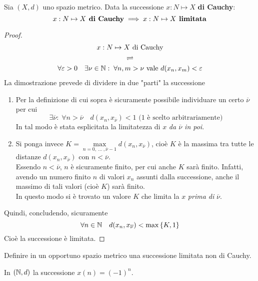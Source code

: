 \begin{proposition}
	\label{prop:se_cau_allora_lim}
	Sia $(X,d)$ uno spazio metrico. Data la successione $x: N \mapsto X$ \textbf{di Cauchy}:
	$$x: N \mapsto X \text{\textbf{ di Cauchy}} \implies x: N \mapsto X \text{\textbf{ limitata}}$$
	\begin{proof}
		\begin{equation*}
			\begin{gathered}
				x: N \mapsto X \text{ di Cauchy}\\
				\rightleftharpoons\\
				\forall \varepsilon > 0\quad \exists \nu \in \mathbb{N}:\; \forall n,m > \nu \text{ vale } d(x_n, x_m) < \varepsilon
			\end{gathered}
		\end{equation*}
		La dimostrazione prevede di dividere in due "parti" la successione
		\begin{enumerate}
			\item Per la definizione di cui sopra è sicuramente possibile individuare un certo $\overline{\nu}$ per cui
				$$\exists \overline{\nu}:\; \forall n > \overline{\nu} \quad d(x_n, x_{\overline{\nu}}) < 1 \text{ (1 è scelto arbitrariamente)}$$
				In tal modo è stata esplicitata la limitatezza di $x$ \textit{da $\overline{\nu}$ in poi}.
			\item Si ponga invece $K = \max\limits_{n=0,\: \dotsc \:, \overline{\nu}-1} d(x_n, x_{\overline{\nu}})$, cioè $K$ è la massima tra tutte le distanze $d(x_n, x_{\overline{\nu}})$ con $n < \overline{\nu}$.\\
				Essendo $n < \overline{\nu}$, $n$ è sicuramente finito, per cui anche $K$ sarà finito. Infatti, avendo un numero finito $n$ di valori $x_n$ assunti dalla successione, anche il massimo di tali valori (cioè $K$) sarà finito.\\
				In questo modo si è trovato un valore $K$ che limita la $x$ \textit{prima di} $\overline{\nu}$.
		\end{enumerate}
		Quindi, concludendo, sicuramente
		$$\forall n \in \mathbb{N} \quad d(x_n, x_{\overline{\nu}}) < \max \left\{K, 1\right\}$$
		Cioè la successione è limitata.
	\end{proof}
\end{proposition}
\begin{exercise}
	\label{ex:succ_lim_non_cau}
	Definire in un opportuno spazio metrico una successione limitata non di Cauchy.
	\begin{solution}
		In $(\mathbb{N},d)$ la successione $x(n) = (-1)^n$.
	\end{solution}
\end{exercise}
